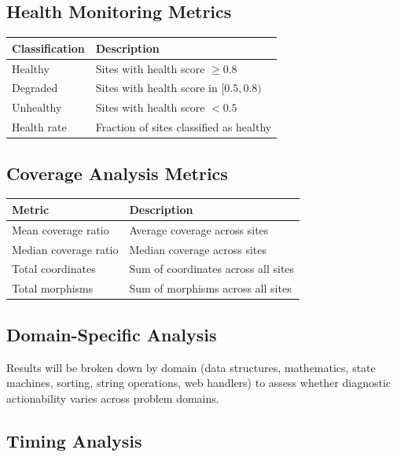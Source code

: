\documentclass[11pt]{article}
\begin{document}
\subsection{Health Monitoring Metrics}

\begin{center}
\begin{tabular}{lp{8cm}}
\toprule
\textbf{Classification} & \textbf{Description} \\
\midrule
Healthy   & Sites with health score $\geq 0.8$ \\
Degraded  & Sites with health score in $[0.5, 0.8)$ \\
Unhealthy & Sites with health score $< 0.5$ \\
Health rate & Fraction of sites classified as healthy \\
\bottomrule
\end{tabular}
\end{center}

\subsection{Coverage Analysis Metrics}

\begin{center}
\begin{tabular}{lp{8cm}}
\toprule
\textbf{Metric} & \textbf{Description} \\
\midrule
Mean coverage ratio   & Average coverage across sites \\
Median coverage ratio & Median coverage across sites \\
Total coordinates     & Sum of coordinates across all sites \\
Total morphisms       & Sum of morphisms across all sites \\
\bottomrule
\end{tabular}
\end{center}

\subsection{Domain-Specific Analysis}

Results will be broken down by domain (data structures, mathematics, state
machines, sorting, string operations, web handlers) to assess whether
diagnostic actionability varies across problem domains.

\subsection{Timing Analysis}
\end{document}
